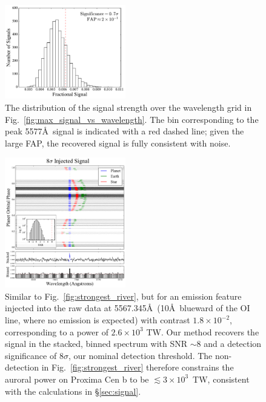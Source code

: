 \documentclass{emulateapj}
\begin{document}
\begin{figure}[bt]
\includegraphics[width=0.47\textwidth]{5577_fap.pdf}
\caption{The distribution of the signal strength over the wavelength grid in Fig.~\ref{fig:max_signal_vs_wavelength}. The bin corresponding to the peak 5577\AA\ signal is indicated with a red dashed line; given the large FAP, the recovered signal is fully consistent with noise.\\[0in]}
\label{fig:fap}
\end{figure}

\begin{figure}[bt]
\includegraphics[width=0.47\textwidth]{5577_injection_river.pdf}
\caption{Similar to Fig.~\ref{fig:strongest_river}, but for an emission feature injected into the raw data at 5567.345\AA\ (10\AA\ blueward of the OI line, where no emission is expected) with contrast $1.8\times 10^{-2}$, corresponding to a power of $2.6\times 10^3$ TW. Our method recovers the signal in the stacked, binned spectrum with SNR ${\sim} 8$ and a detection significance of $8\sigma$, our nominal detection threshold. The non-detection in Fig.~\ref{fig:strongest_river} therefore constrains the auroral power on Proxima Cen b to be $\lesssim 3\times 10^{3}$~TW, consistent with the calculations in \S\ref{sec:signal}.\\[0in]}
\label{fig:injection_river}
\end{figure}
\end{document}
